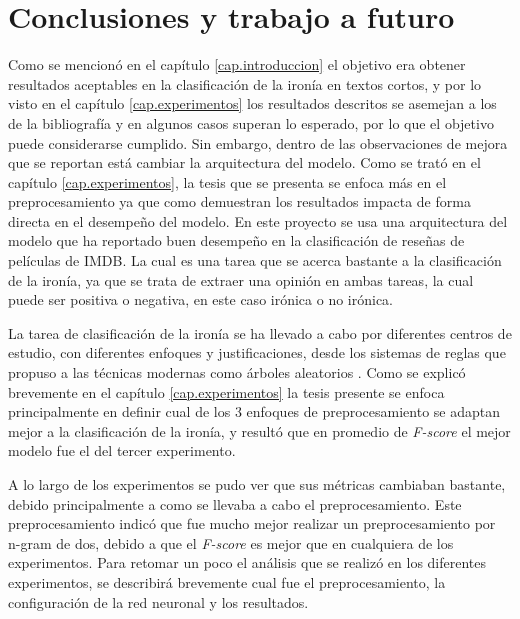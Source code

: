 
\chapter{Conclusiones y trabajo a futuro}\label{cap.conclusiones}

\par Como se mencionó en el capítulo \ref{cap.introduccion} el objetivo era obtener resultados aceptables en la clasificación de la ironía en textos cortos, y por lo visto en el capítulo \ref{cap.experimentos} los resultados descritos se asemejan a los de la bibliografía y en algunos casos superan lo esperado, por lo que el objetivo puede considerarse cumplido. Sin embargo, dentro de las observaciones de mejora que se reportan está cambiar la arquitectura del modelo. Como se trató en el capítulo \ref{cap.experimentos}, la tesis que se presenta se enfoca más en el preprocesamiento ya que como demuestran los resultados impacta de forma directa en el desempeño del modelo. En este proyecto se usa una arquitectura del modelo que ha reportado buen desempeño en la clasificación de reseñas de películas de IMDB. La cual es una tarea que se acerca bastante a la clasificación de la ironía, ya que se trata de extraer una opinión en ambas tareas, la cual puede ser positiva o negativa, en este caso irónica o no irónica.

\begin{table}[H]
	\centering
	
	\label{tab:total2}
\end{table}


\par La tarea de clasificación  de la ironía se ha llevado a cabo por diferentes centros de estudio, con diferentes enfoques y justificaciones, desde los sistemas de reglas que propuso \textcite{utsumi1996unified} a las técnicas modernas como árboles aleatorios \textcite{lopez2016character}. Como se explicó brevemente en el capítulo \ref{cap.experimentos} la tesis presente se enfoca principalmente en definir cual de los 3 enfoques de preprocesamiento se adaptan mejor a la clasificación de la ironía, y resultó que en promedio de \textit{F-score} el mejor modelo fue el del tercer experimento. %

\par A lo largo de los experimentos se pudo ver que sus métricas cambiaban bastante, debido principalmente a como se llevaba a cabo el preprocesamiento. Este preprocesamiento indicó que fue mucho mejor realizar un preprocesamiento por n-gram de dos, debido a que el \textit{F-score} es mejor que en cualquiera de los experimentos. Para retomar un poco el análisis que se realizó en los diferentes experimentos, se describirá brevemente cual fue el preprocesamiento, la configuración de la red neuronal y los resultados.

